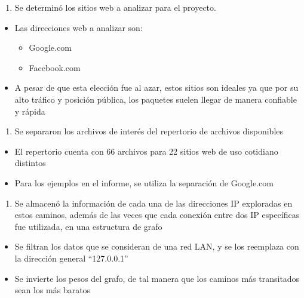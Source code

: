 \documentclass[11pt]{article}
\providecommand{\tightlist}{%
      \setlength{\itemsep}{0pt}\setlength{\parskip}{0pt}}
\begin{document}
\begin{enumerate}
\def\labelenumi{\arabic{enumi}.}
\tightlist
\item
  Se determinó los sitios web a analizar para el proyecto.
\end{enumerate}

\begin{itemize}
\tightlist
\item
  Las direcciones web a analizar son:

  \begin{itemize}
  \tightlist
  \item
    Google.com
  \item
    Facebook.com
  \end{itemize}
\item
  A pesar de que esta elección fue al azar, estos sitios son ideales ya
  que por su alto tráfico y posición pública, los paquetes suelen llegar
  de manera confiable y rápida
\end{itemize}

\begin{enumerate}
\def\labelenumi{\arabic{enumi}.}
\setcounter{enumi}{1}
\tightlist
\item
  Se separaron los archivos de interés del repertorio de archivos
  disponibles
\end{enumerate}

\begin{itemize}
\tightlist
\item
  El repertorio cuenta con 66 archivos para 22 sitios web de uso
  cotidiano distintos
\item
  Para los ejemplos en el informe, se utiliza la separación de
  Google.com
\end{itemize}

\begin{enumerate}
\def\labelenumi{\arabic{enumi}.}
\setcounter{enumi}{2}
\tightlist
\item
  Se almacenó la información de cada una de las direcciones IP
  exploradas en estos caminos, además de las veces que cada conexión
  entre dos IP específicas fue utilizada, en una estructura de grafo
\end{enumerate}

\begin{itemize}
\tightlist
\item
  Se filtran los datos que se consideran de una red LAN, y se los
  reemplaza con la dirección general ``127.0.0.1''
\item
  Se invierte los pesos del grafo, de tal manera que los caminos más
  transitados sean los más baratos
\end{itemize}
\end{document}
